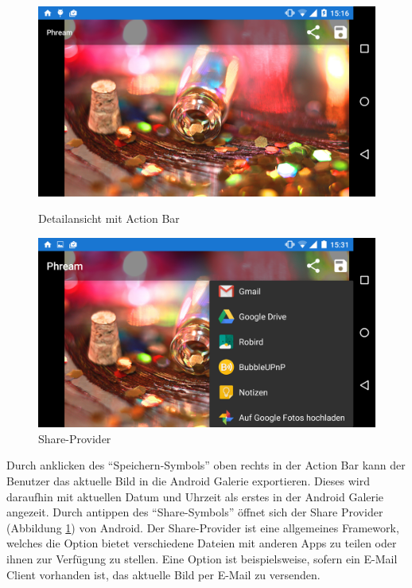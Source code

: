 \begin{figure}[H]
\centering
	\begin{minipage}{0.4\textwidth} 
	\centering
	\includegraphics[width=1\textwidth]{images/screenshots/fullscreenview_menu.png}
	\caption{Detailansicht mit Action Bar}
	\label{label:fullscreenview_menu}
	\end{minipage}
	\hfill
	\begin{minipage}{0.4\textwidth}
	\centering
	\includegraphics[width=1\textwidth]{images/screenshots/fullscreenview_share.png}
	\caption{Share-Provider}
	\label{label:fullscreenview_share}
	\end{minipage}
\end{figure}

Durch anklicken des \enquote{Speichern-Symbols} oben rechts in der Action Bar kann der Benutzer das aktuelle Bild in die Android Galerie exportieren. Dieses wird daraufhin mit aktuellen Datum und Uhrzeit als erstes in der Android Galerie angezeit. Durch antippen des \enquote{Share-Symbols} öffnet sich der Share Provider (Abbildung \ref{label:fullscreenview_share}) von Android. Der Share-Provider ist eine allgemeines Framework, welches die Option bietet verschiedene Dateien mit anderen Apps zu teilen oder ihnen zur Verfügung zu stellen. Eine Option ist beispielsweise, sofern ein E-Mail Client vorhanden ist, das aktuelle Bild per E-Mail zu versenden.

